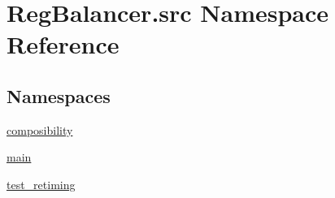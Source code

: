 \hypertarget{namespaceRegBalancer_1_1src}{}\section{Reg\+Balancer.\+src Namespace Reference}
\label{namespaceRegBalancer_1_1src}
\subsection*{Namespaces}
\begin{DoxyCompactItemize}
\item 
 \hyperlink{namespaceRegBalancer_1_1src_1_1composibility}{composibility}
\item 
 \hyperlink{namespaceRegBalancer_1_1src_1_1main}{main}
\item 
 \hyperlink{namespaceRegBalancer_1_1src_1_1test__retiming}{test\+\_\+retiming}
\end{DoxyCompactItemize}
